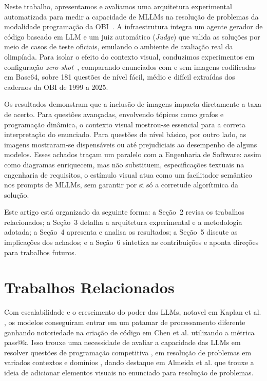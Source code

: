 \documentclass[sigconf,anonymous]{acmart} %
\begin{document}
Neste trabalho, apresentamos e avaliamos uma arquitetura experimental automatizada 
para medir a capacidade de MLLMs na resolução de problemas da modalidade programação 
da OBI~\cite{obi_passadas}. A infraestrutura integra um agente gerador de código 
baseado em LLM e um juiz automático (\textit{Judge}) que valida as soluções por 
meio de casos de teste oficiais, emulando o ambiente de avaliação real da olimpíada. 
Para isolar o efeito do contexto visual, conduzimos experimentos em configuração 
\textit{zero-shot}~\cite{wei2021finetuned}, comparando enunciados com e sem imagens 
codificadas em Base64, sobre 181 questões de nível fácil, médio e difícil extraídas 
dos cadernos da OBI de 1999 a 2025.

Os resultados demonstram que a inclusão de imagens impacta diretamente a taxa de 
acerto. Para questões avançadas, envolvendo tópicos como grafos e programação 
dinâmica, o contexto visual mostrou-se essencial para a correta interpretação do 
enunciado. Para questões de nível básico, por outro lado, as imagens mostraram-se 
dispensáveis ou até prejudiciais ao desempenho de alguns modelos. Esses achados 
traçam um paralelo com a Engenharia de Software: assim como diagramas enriquecem, mas não substituem, especificações textuais na engenharia de requisitos, o 
estímulo visual atua como um facilitador semântico nos prompts de MLLMs, sem 
garantir por si só a corretude algorítmica da solução.

Este artigo está organizado da seguinte forma: a Seção~2 revisa os trabalhos 
relacionados; a Seção~3 detalha a arquitetura experimental e a metodologia adotada; 
a Seção~4 apresenta e analisa os resultados; a Seção~5 discute as implicações dos 
achados; e a Seção~6 sintetiza as contribuições e aponta direções para trabalhos 
futuros.

\section{Trabalhos Relacionados}
Com escalabilidade e o crescimento do poder das LLMs, notavel em Kaplan et al. \cite{kaplan2020scaling}, os modelos conseguiram entrar em um patamar de processamento diferente ganhando notoriedade na criação de código em Chen et al.\cite{Chen:2021:ELL} utilizando a métrica pass@k.
Isso trouxe uma necessidade de avaliar a capacidade das LLMs em resolver questões de programação competitiva \cite{Zheng2025LiveCodeBenchPH}, em resolução de problemas em variados contextos e domínios \cite{Viegas2025AssessingTC, Mendona2024EvaluatingCV, nunes2023evaluating}, dando destaque em Almeida et al. \cite{Almeida2023BLUEXAB} que trouxe a ideia de adicionar elementos visuais no enunciado para resolução de problemas.
\end{document}
